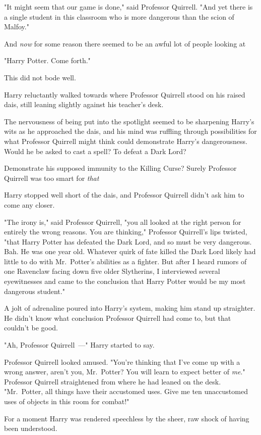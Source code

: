 "It might seem that our game is done," said Professor Quirrell. "And yet there
is a single student in this classroom who is more dangerous than the scion of
Malfoy."

And \emph{now} for some reason there seemed to be an awful lot of people
looking at{\el}

"Harry Potter. Come forth."

This did not bode well.

Harry reluctantly walked towards where Professor Quirrell stood on his raised
dais, still leaning slightly against his teacher's desk.

The nervousness of being put into the spotlight seemed to be sharpening Harry's
wits as he approached the dais, and his mind was ruffling through possibilities
for what Professor Quirrell might think could demonstrate Harry's
dangerousness. Would he be asked to cast a spell? To defeat a Dark Lord?

Demonstrate his supposed immunity to the Killing Curse? Surely Professor
Quirrell was too smart for \emph{that}{\el}

Harry stopped well short of the dais, and Professor Quirrell didn't ask him to
come any closer.

"The irony is," said Professor Quirrell, "you all looked at the right person
for entirely the wrong reasons. You are thinking," Professor Quirrell's lips
twisted, "that Harry Potter has defeated the Dark Lord, and so must be very
dangerous. Bah. He was one year old. Whatever quirk of fate killed the Dark
Lord likely had little to do with Mr.~Potter's abilities as a fighter. But
after I heard rumors of one Ravenclaw facing down five older Slytherins, I
interviewed several eyewitnesses and came to the conclusion that Harry Potter
would be my most dangerous student."

A jolt of adrenaline poured into Harry's system, making him stand up
straighter. He didn't know what conclusion Professor Quirrell had come to, but
that couldn't be good.

"Ah, Professor Quirrell~---" Harry started to say.

Professor Quirrell looked amused. "You're thinking that I've come up with a
wrong answer, aren't you, Mr.~Potter? You will learn to expect better of
\emph{me}." Professor Quirrell straightened from where he had leaned on the
desk. "Mr.~Potter, all things have their accustomed uses. Give me ten
unaccustomed uses of objects in this room for combat!"

For a moment Harry was rendered speechless by the sheer, raw shock of having
been understood.

